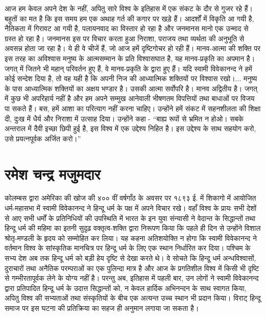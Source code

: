 आज हम केवल अपने देश के नहीं, अपितु सारे विश्व के इतिहास में एक संकट के दौर से गुजर रहे हैं। बहुतों का मत है कि इस समय हम एक अथाह गर्त की कगार पर खड़े हैं। आदर्शों में विकृति आ गयी है, नैतिकता में गिरावट आ गयी है, पलायनवाद का विस्तार हो रहा है और जनमानस मानो एक उन्माद से ग्रस्त हो रहा है। जनमानस इस पर विचार करता हुआ निराशा, पराजय तथा व्यर्थता की अनुभूति से अवसन्न होता जा रहा है। ये ही वे चीजें हैं, जो आज हमें दृष्टिगोचर हो रही हैं। मानव-आत्मा की शक्ति पर इस तरह का अविश्वास मनुष्य के आत्मसम्मान के प्रति विश्वासघात है, यह मानव-प्रकृति का अपमान है। जगत् में जितने भी महान् परिवर्तन हुए हैं, वे मानव-प्रकृति के द्वारा हुए हैं। यदि स्वामी विवेकानन्द ने हमें कोई सन्देश दिया है, तो वह यही है कि अपनी निज की आध्यात्मिक शक्तियों पर विश्वास रखो।... मनुष्य के पास आध्यात्मिक शक्तियों का अक्षय भण्डार है। उसकी आत्मा सर्वोपरि है। मानव अद्वितीय है। जगत् में कुछ भी अपरिहार्य नहीं है और हम अपने सम्मुख आनेवाली भीषणतम विपत्तियों तथा बाधाओं पर विजय पा सकते हैं। बस, हमें आशा का परित्याग नहीं करना चाहिए। उन्होंने हमें संकट में सहनशीलता की शिक्षा दी, दुःख में धैर्य और निराशा में उत्साह दिया। उन्होंने कहा - “बाह्य रूपों से भ्रमित न होओ। सबके अन्तराल में दैवी इच्छा छिपी हुई है, इस विश्व में एक उद्देश्य निहित है। इस उद्देश्य के साथ सहयोग करो, उसे प्रयत्नपूर्वक अर्जित करो।”


\section*{रमेश चन्द्र मजुमदार}


कोलम्बस द्वारा अमेरिका की खोज की ४०० वीं वर्षगाँठ के अवसर पर १८९३ ई. में शिकागो में आयोजित धर्म-महासभा में स्वामी विवेकानन्द ने हिन्दू धर्म के पक्ष में अपने विचार रखे। वहाँ विश्व के प्रायः सभी देशों से आए सभी धर्मों के प्रतिनिधियों की उपस्थिति में भारत के इन युवा संन्यासी ने वेदान्त के सिद्धान्तों तथा हिन्दू धर्म की महिमा का इतनी सुदृढ़ वक्तृत्व-शक्ति द्वारा निरूपण किया कि पहले ही दिन से उन्होंने विशाल श्रोतृ-मण्डली के हृदय को सम्मोहित कर लिया। यह कहना अतिशयोक्ति न होगा कि स्वामी विवेकानन्द ने वर्तमान विश्व के सांस्कृतिक मानचित्र पर हिन्दू धर्म के लिए एक स्थान निर्धारित कर दिया। पश्चिम के सभ्य देश अब तक हिन्दू धर्म को बड़ी हेय दृष्टि से देखा करते थे। वे सोचते कि हिन्दू धर्म अन्धविश्वासों, दुराचारों तथा अनैतिक परम्पराओं का एक पुलिन्दा मात्र है और आज के प्रगतिशील विश्व में किसी भी दृष्टि से गम्भीरतापूर्वक लेने के योग्य नहीं है। परन्तु अब, इतिहास में पहली बार, उन लोगों ने स्वामी विवेकानन्द द्वारा प्रतिपादित हिन्दू धर्म के उदात्त सिद्धान्तों को, न केवल हार्दिक अभिनन्दन के साथ स्वागत किया, अपितु विश्व की सभ्यताओं तथा संस्कृतियों के बीच एक अत्यन्त उच्च स्थान भी प्रदान किया। विराट् हिन्दू समाज पर इस घटना की प्रतिक्रिया का सहज ही अनुमान लगाया जा सकता है। 

